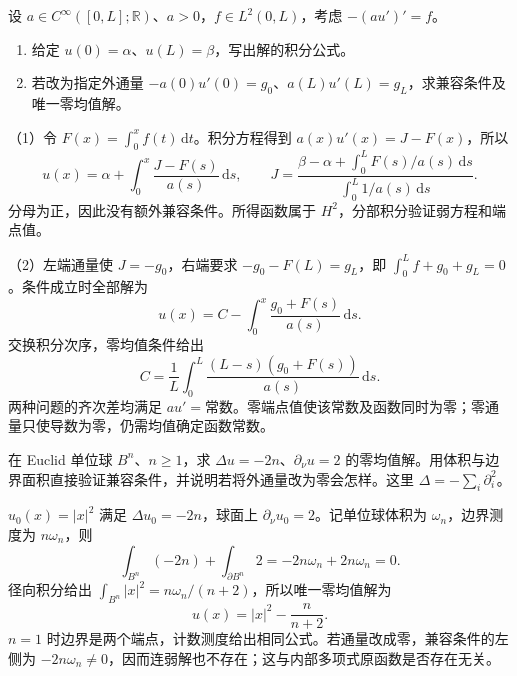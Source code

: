 \BookExercises

\begin{exercise}\label{g3:ex:interval-variable-flux}
	设 \(a\in C^\infty([0,L];\mathbb R)\)、\(a>0\)，\(f\in L^2(0,L)\)，考虑 \(-(au')'=f\)。
	\begin{enumerate}
		\item 给定 \(u(0)=\alpha\)、\(u(L)=\beta\)，写出解的积分公式。
		\item 若改为指定外通量 \(-a(0)u'(0)=g_0\)、\(a(L)u'(L)=g_L\)，求兼容条件及唯一零均值解。
	\end{enumerate}
\end{exercise}
\begin{solution}
	（1）令 \(F(x)=\int_0^xf(t)\,\mathrm dt\)。积分方程得到 \(a(x)u'(x)=J-F(x)\)，所以
	\[
		u(x)=\alpha+\int_0^x\frac{J-F(s)}{a(s)}\,\mathrm ds,\qquad
		J=\frac{\beta-\alpha+\int_0^LF(s)/a(s)\,\mathrm ds}
		{\int_0^L1/a(s)\,\mathrm ds}.
	\]
	分母为正，因此没有额外兼容条件。所得函数属于 \(H^2\)，分部积分验证弱方程和端点值。

	（2）左端通量使 \(J=-g_0\)，右端要求 \(-g_0-F(L)=g_L\)，即
	\(\int_0^Lf+g_0+g_L=0\)。条件成立时全部解为
	\[
		u(x)=C-\int_0^x\frac{g_0+F(s)}{a(s)}\,\mathrm ds.
	\]
	交换积分次序，零均值条件给出
	\[
		C=\frac1L\int_0^L\frac{(L-s)(g_0+F(s))}{a(s)}\,\mathrm ds.
	\]
	两种问题的齐次差均满足 \(a u'=\text{常数}\)。零端点值使该常数及函数同时为零；零通量只使导数为零，仍需均值确定函数常数。
\end{solution}

\begin{exercise}\label{g3:ex:ball-neumann-flux-sign}
	在 Euclid 单位球 \(B^n\)、\(n\ge1\)，求 \(\Delta u=-2n\)、\(\partial_\nu u=2\) 的零均值解。用体积与边界面积直接验证兼容条件，并说明若将外通量改为零会怎样。这里 \(\Delta=-\sum_i\partial_i^2\)。
\end{exercise}
\begin{solution}
	\(u_0(x)=|x|^2\) 满足 \(\Delta u_0=-2n\)，球面上 \(\partial_\nu u_0=2\)。记单位球体积为 \(\omega_n\)，边界测度为 \(n\omega_n\)，则
	\[
		\int_{B^n}(-2n)+\int_{\partial B^n}2
		=-2n\omega_n+2n\omega_n=0.
	\]
	径向积分给出 \(\int_{B^n}|x|^2=n\omega_n/(n+2)\)，所以唯一零均值解为
	\[
		u(x)=|x|^2-\frac n{n+2}.
	\]
	\(n=1\) 时边界是两个端点，计数测度给出相同公式。若通量改成零，兼容条件的左侧为 \(-2n\omega_n\ne0\)，因而连弱解也不存在；这与内部多项式原函数是否存在无关。
\end{solution}

